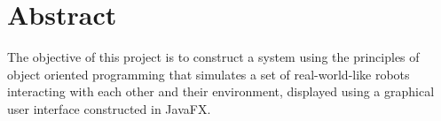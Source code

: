 \chapter{Abstract}

The objective of this project is to construct a system using the principles of object oriented programming that simulates a set of real-world-like robots interacting with each other and their environment, displayed using a graphical user interface constructed in JavaFX.